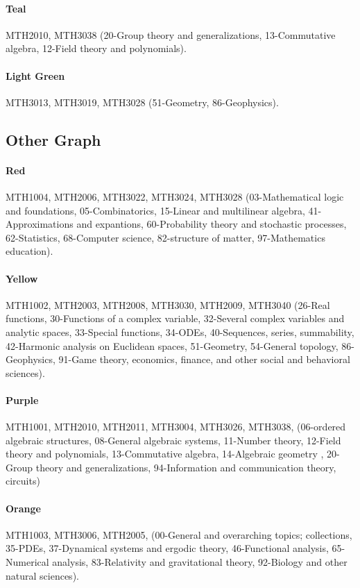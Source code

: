 \documentclass[english, 12pt]{article}
\begin{document}
\paragraph{Teal} MTH2010, MTH3038 (20-Group theory and generalizations, 13-Commutative algebra, 12-Field theory and polynomials).
\paragraph{Light Green} MTH3013, MTH3019, MTH3028 (51-Geometry, 86-Geophysics).
\parskip=0.0pt

\subsection{Other Graph} \label{app:other_graph_communities}
\paragraph{Red} MTH1004, MTH2006, MTH3022, MTH3024, MTH3028 (03-Mathematical logic and foundations, 05-Combinatorics, 15-Linear and multilinear algebra, 41-Approximations and expantions, 60-Probability theory and stochastic processes, 62-Statistics, 68-Computer science, 82-structure of matter, 97-Mathematics education).
\parskip=-16.0pt
\paragraph{Yellow} MTH1002, MTH2003, MTH2008, MTH3030, MTH2009, MTH3040 (26-Real functions, 30-Functions of a complex variable, 32-Several complex variables and analytic spaces, 33-Special functions, 34-ODEs, 40-Sequences, series, summability, 42-Harmonic analysis on Euclidean spaces, 51-Geometry, 54-General topology, 86-Geophysics, 91-Game theory, economics, finance, and other social and behavioral sciences).
\paragraph{Purple} MTH1001, MTH2010, MTH2011, MTH3004, MTH3026, MTH3038, (06-ordered algebraic structures, 08-General algebraic systems, 11-Number theory, 12-Field theory and polynomials, 13-Commutative algebra, 14-Algebraic geometry , 20-Group theory and generalizations, 94-Information and communication theory, circuits)
\paragraph{Orange} MTH1003, MTH3006, MTH2005, (00-General and overarching topics; collections, 35-PDEs, 37-Dynamical systems and ergodic theory, 46-Functional analysis, 65-Numerical analysis, 83-Relativity and gravitational theory, 92-Biology and other natural sciences).
\end{document}
